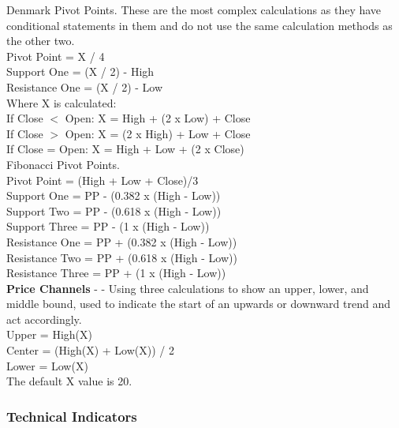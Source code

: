 \documentclass[12pt,a4paper]{article}
\begin{document}
\noindent
Denmark Pivot Points. These are the most complex calculations as they have conditional statements in them and do not use the same calculation methods as the other two.\\
Pivot Point = X / 4\\
Support One = (X / 2) - High\\
Resistance One = (X / 2) - Low\\

\noindent
Where X is calculated: \\
If Close $<$ Open: X = High + (2 x Low) + Close\\
If Close $>$ Open: X = (2 x High) + Low + Close\\
If Close = Open: X = High + Low + (2 x Close)\\

\noindent
Fibonacci Pivot Points. \\
Pivot Point = (High + Low + Close)/3\\
Support One = PP - (0.382 x (High  -  Low))\\
Support Two = PP - (0.618 x (High  -  Low))\\
Support Three = PP - (1 x (High  -  Low))\\
Resistance One = PP + (0.382 x (High  -  Low))\\
Resistance Two = PP + (0.618 x (High  -  Low))\\
Resistance Three = PP + (1 x (High  -  Low))\\

\iffalse
[]
\fi

\noindent
\textbf{Price Channels} - \cite{Murphy1999} - Using three calculations to show an upper, lower, and middle bound, used to indicate the start of an upwards or downward trend and act accordingly.\\

\noindent
Upper = High(X)\\
Center = (High(X) + Low(X)) / 2\\
Lower = Low(X)\\
The default X value is 20.\\

\iffalse
[]
\fi

\iffalse
#################################################################################
\fi

\subsubsection*{Technical Indicators}
\end{document}
